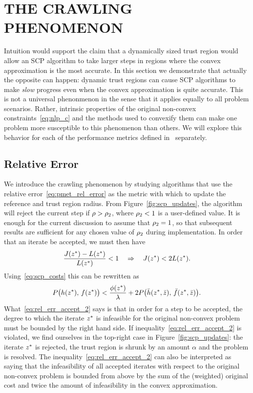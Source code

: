 \documentclass[letterpaper, 10 pt, conference]{ieeeconf}
\begin{document}
\section{THE CRAWLING PHENOMENON}\label{sec:crawling}

Intuition would support the claim that a dynamically sized trust region would allow an SCP algorithm to take larger steps in regions where the convex approximation is the most accurate. In this section we demonstrate that actually the opposite can happen: dynamic trust regions can cause SCP algorithms to make \textit{slow} progress even when the convex approximation is quite accurate. This is not a universal phenonmenon in the sense that it applies equally to all problem scenarios. Rather, intrinsic properties of the original non-convex constraints~\eqref{eq:nlp_c} and the methods used to convexify them can make one problem more susceptible to this phenomenon than others. We will explore this behavior for each of the performance metrics defined in~ separately.

\subsection{Relative Error}\label{subsec:creep_rel_err}

We introduce the crawling phenomenon by studying algorithms that use the relative error~\eqref{eq:pmet_rel_error} as the metric with which to update the reference and trust region radius. From Figure~\ref{fig:scp_updates}, the algorithm will reject the current step if $\rho>\rho_2$, where $\rho_2<1$ is a user-defined value. It is enough for the current discussion to assume that $\rho_2=1$, so that subsequent results are sufficient for any chosen value of $\rho_2$ during implementation. In order that an iterate be accepted, we must then have
\begin{equation}
\frac{J(z^*) - L(z^*)}{L(z^*)} < 1 \quad \Rightarrow \quad  J(z^*) < 2 L(z^*).
\label{eq:rel_err_accept}
\end{equation} 
Using~\eqref{eq:scp_costs} this can be rewritten as
\begin{equation}
P\big( h(z^*),\,f(z^*) \big) < \frac{\phi(z^*)}{\lambda} + 2 P\big( \bar{h}(z^*,\bar{z}),\,\bar{f}(z^*,\bar{z}) \big).
\label{eq:rel_err_accept_2}
\end{equation}
What~\eqref{eq:rel_err_accept_2} says is that in order for a step to be accepted, the degree to which the iterate $z^*$ is infeasible for the original non-convex problem must be bounded by the right hand side. If inequality~\eqref{eq:rel_err_accept_2} is violated, we find ourselves in the top-right case in Figure~\ref{fig:scp_updates}: the iterate $z^*$ is rejected, the trust region is shrunk by an amount $\alpha$ and the problem is resolved. The inequality~\eqref{eq:rel_err_accept_2} can also be interpreted as saying that the infeasibility of all accepted iterates with respect to the original non-convex problem is bounded from above by the sum of the (weighted) original cost and twice the amount of infeasibility in the convex approximation. 
\end{document}
